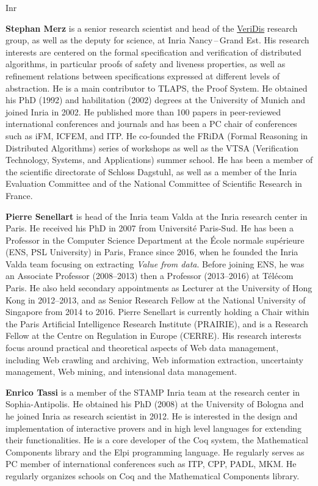 \begin{sitedescription}{Inr}
\begin{compactitem}
\item{\bf Stephan Merz} is a senior research
scientist and head of the \href{https://team.inria.fr/veridis/}{VeriDis}
research group, as well as the deputy for science, at Inria Nancy\,--\,Grand Est.
His research interests are centered on the formal specification and verification
of distributed algorithms, in particular proofs of safety and liveness
properties, as well as refinement relations between specifications expressed at
different levels of abstraction. He is a main contributor to TLAPS, the \tlaplus
Proof System. He obtained his PhD (1992) and habilitation (2002) degrees at the
University of Munich and joined Inria in 2002. He published more than 100 papers
in peer-reviewed international conferences and journals and has been a PC chair
of conferences such as iFM, ICFEM, and ITP. He co-founded the FRiDA (Formal
Reasoning in Distributed Algorithms) series of workshops as well as the VTSA
(Verification Technology, Systems, and Applications) summer school. He has been
a member of the scientific directorate of Schloss Dagstuhl, as well as a member
of the Inria Evaluation Committee and of the National Committee of Scientific
Research in France.

\item{\bf Pierre Senellart} is head of the Inria team Valda at the Inria
  research center in Paris. He
  received his PhD in 2007 from Université Paris-Sud. He has been a
    Professor in the Computer Science Department at the École normale
    supérieure (ENS, PSL University) in Paris, France since 2016, when he
    founded the Inria Valda team focusing on extracting \emph{Value from
    data}. Before joining ENS, he was an Associate Professor (2008–2013)
    then a Professor (2013–2016) at Télécom Paris. He also held secondary
    appointments as Lecturer at the University of Hong Kong in 2012–2013,
    and as Senior Research Fellow at the National University of Singapore
    from 2014 to 2016. Pierre Senellart is currently holding a Chair
    within the Paris Artificial Intelligence Research Institute
    (PRAIRIE), and is a Research Fellow at the Centre on Regulation in
    Europe (CERRE).
    His research interests
    focus around practical and theoretical aspects of Web data
    management, including Web crawling and archiving, Web information
    extraction, uncertainty management, Web mining, and intensional data
    management.

\item{\bf Enrico Tassi} is a member of the STAMP Inria team at the research
center in Sophia-Antipolis. He obtained his PhD (2008) at the University of
Bologna and he joined Inria as research scientist in 2012.
He is interested in the design and implementation of interactive
provers and in high level languages for extending their functionalities.
He is a core developer of the Coq system, the Mathematical Components library
and the Elpi programming language. He regularly serves as PC member of
international conferences such as ITP, CPP, PADL, MKM. He regularly organizes
schools on Coq and the Mathematical Components library.


\end{compactitem}
\end{sitedescription}
